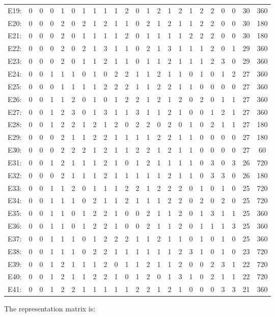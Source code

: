 \documentclass[12pt]{article}
\begin{document}
\begin{center}
\begin{tabular}{ccccccccccccccccccccc|c|c}
E19:&0&0&0&1&0&1&1&1&1&2&0&1&2&1&2&1&2&2&0&0&30&360\\
E20:&0&0&0&2&0&2&1&2&1&1&0&2&1&2&1&1&2&2&0&0&30&180\\
E21:&0&0&0&2&0&1&1&1&1&2&0&1&1&1&1&2&2&2&0&0&30&180\\
E22:&0&0&0&2&0&2&1&3&1&1&0&2&1&3&1&1&1&2&0&1&29&360\\
E23:&0&0&0&2&0&1&1&2&1&1&0&1&1&2&1&1&1&2&3&0&29&360\\
E24:&0&0&1&1&1&0&1&0&2&2&1&1&2&1&1&0&1&0&1&2&27&360\\
E25:&0&0&0&1&1&1&1&2&2&2&1&1&2&2&1&1&0&0&0&0&27&360\\
E26:&0&0&1&1&2&0&1&0&1&2&2&1&2&1&2&0&2&0&1&1&27&360\\
E27:&0&0&1&2&3&0&1&3&1&1&3&1&1&2&1&0&0&1&2&1&27&360\\
E28:&0&0&1&2&2&1&2&1&2&0&2&2&0&2&0&1&0&2&1&1&27&180\\
E29:&0&0&0&2&1&1&2&2&1&1&1&1&2&2&1&1&0&0&0&0&27&180\\
E30:&0&0&0&2&2&2&1&2&1&1&2&2&1&2&1&1&0&0&0&0&27&60\\
E31:&0&0&1&2&1&1&1&2&1&0&1&2&1&1&1&1&0&3&0&3&26&720\\
E32:&0&0&0&2&1&1&1&2&1&1&1&1&1&2&1&1&0&3&3&0&26&180\\
E33:&0&0&1&1&2&0&1&1&1&2&2&1&2&2&2&0&1&0&1&0&25&720\\
E34:&0&0&1&1&1&0&2&1&1&2&1&1&1&2&2&0&2&0&2&0&25&720\\
E35:&0&0&1&1&0&1&2&2&1&0&0&2&1&1&2&0&1&3&1&1&25&360\\
E36:&0&0&1&1&0&1&2&2&1&0&0&2&1&1&2&0&1&1&1&3&25&360\\
E37:&0&0&1&1&1&0&1&2&2&2&1&1&2&1&1&0&1&0&1&0&25&360\\
E38:&0&0&1&1&1&0&2&2&1&1&1&1&1&1&2&3&1&0&1&0&23&720\\
E39:&0&0&1&2&1&1&1&2&0&1&1&2&1&1&2&0&0&2&3&1&22&720\\
E40:&0&0&1&2&1&1&2&2&1&0&1&2&0&1&3&1&0&2&1&1&22&720\\
E41:&0&0&1&2&2&1&1&1&1&1&2&2&1&2&1&0&0&0&3&3&21&360\\
\end{tabular}
\end{center}
The representation matrix is:
\end{document}
